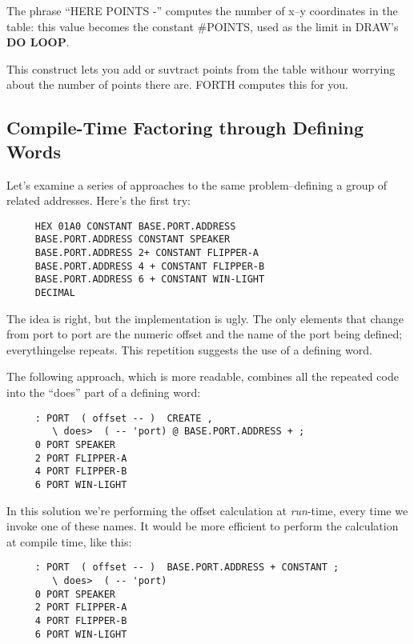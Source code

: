 \documentclass{book}
\begin{document}
\noindent
The phrase ``HERE POINTS -'' computes the number of x--y coordinates in the table: this value becomes the constant \#POINTS, used as the limit in DRAW's \textbf{DO LOOP}.

This construct lets you add or suvtract points from the table withour worrying about the number of points there are. FORTH computes this for you.

\bigskip

\subsection*{
	\textbf{Compile-Time Factoring through Defining Words}}

Let's examine a series of approaches to the same problem--defining a group of related addresses. Here's the first try:

\begin{verbatim}
     HEX 01A0 CONSTANT BASE.PORT.ADDRESS
     BASE.PORT.ADDRESS CONSTANT SPEAKER
     BASE.PORT.ADDRESS 2+ CONSTANT FLIPPER-A
     BASE.PORT.ADDRESS 4 + CONSTANT FLIPPER-B
     BASE.PORT.ADDRESS 6 + CONSTANT WIN-LIGHT
     DECIMAL
\end{verbatim}

\bigskip

\noindent
The idea is right, but the implementation is ugly. The only elements that change from port to port are the numeric offset and the name of the port being defined; everythingelse repeats. This repetition suggests the use of a defining word.

The following approach, which is more readable, combines all the repeated code into the ``does'' part  of a defining word:

\begin{verbatim}
     : PORT  ( offset -- )  CREATE ,
        \ does>  ( -- 'port) @ BASE.PORT.ADDRESS + ;
     0 PORT SPEAKER
     2 PORT FLIPPER-A
     4 PORT FLIPPER-B
     6 PORT WIN-LIGHT
\end{verbatim}

\noindent
In this solution we're performing the offset calculation at \textit{run}-time, every time we invoke one of these names. It would be more efficient to perform the calculation at compile time, like this:

\begin{verbatim}
     : PORT  ( offset -- )  BASE.PORT.ADDRESS + CONSTANT ;
        \ does>  ( -- 'port)
     0 PORT SPEAKER
     2 PORT FLIPPER-A
     4 PORT FLIPPER-B
     6 PORT WIN-LIGHT
\end{verbatim}
\end{document}
